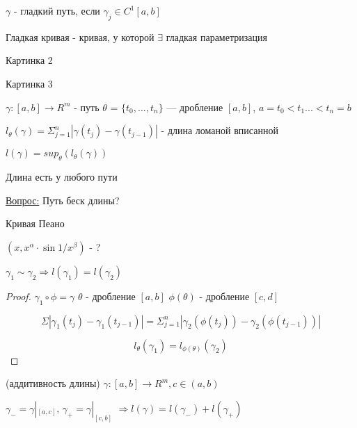 \begin{definition}
    $\gamma$ - гладкий путь, если $\gamma_j \in C^1[a, b]$

    Гладкая кривая - кривая, у которой $\exists$ гладкая параметризация 
\end{definition}

Картинка 2

Картинка 3

\begin{definition}
   $\gamma : [a, b] \to R^m$ - путь $\theta$ = $\{t_0, ..., t_n \}$ --- дробление $[a, b]$, $a = t_0 < t_1 ... < t_n = b$

    $l_\theta(\gamma) = \Sigma_{j = 1}^n | \gamma(t_j) - \gamma(t_{j - 1})|$ - длина ломаной вписанной

    $ l(\gamma) = sup_\theta (l_\theta(\gamma))$
\end{definition}

\begin{remark}
    Длина есть у любого пути
\end{remark}

\underline{Вопрос:} Путь беск длины?

Кривая Пеано

$(x, x  ^ \alpha \cdot \sin{1 / x ^ \beta})$ - ?

\begin{theorem}
    $\gamma_1 \sim \gamma_2 \Rightarrow l(\gamma_1) = l(\gamma_2)$
\end{theorem}

\begin{proof}
    $\gamma_1 \circ \phi = \gamma$ $\theta$ - дробление $[a, b]$
    $\phi(\theta)$ - дробление $[c, d]$

    $$\Sigma |\gamma_1(t_j) - \gamma_1(t_{j - 1})| = \Sigma_{j = 1} ^ n |\gamma_2(\phi(t_j)) - \gamma_2(\phi(t_{j - 1}))|$$

    $$l_\theta(\gamma_1) = l_{\phi(\theta)}(\gamma_2)$$
\end{proof}

\begin{theorem}
    (аддитивность длины) $\gamma : [a, b] \to R^m, c \in (a, b)$

    $\gamma_- = \gamma |_{[a, c]}, \, \gamma_+ = \gamma |_{[c, b]}$
    $\Rightarrow l(\gamma) = l(\gamma_-) + l(\gamma_+)$

\end{theorem}

